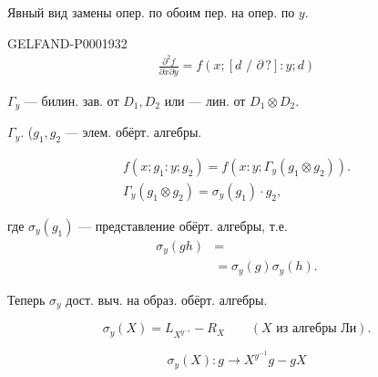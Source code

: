 \par\noindent\begin{minipage}{\linewidth}
Явный вид замены опер. по обоим пер. на опер.
по $y$.



\begin{GelfandAdjacentEvidence}{GELFAND-P000193}{2}
\begin{gather*}
\frac{\partial^2 f}{\partial x\partial y}=f(x;[d\text{ / }\partial\,?]:y;d)
\end{gather*}
\end{GelfandAdjacentEvidence}
\end{minipage}\par


$\Gamma_y$ — билин. зав. от $D_1,D_2$ или — лин. от $D_1\otimes D_2$.





 $\Gamma_y$. ($g_1,g_2$ — элем. обёрт. алгебры.



\begin{gather*}
f(x;g_1:y;g_2)=f(x:y;\Gamma_y(g_1\otimes g_2)).\\
\Gamma_y(g_1\otimes g_2)=\sigma_y(g_1)\cdot g_2,
\end{gather*}



где $\sigma_y(g_1)$ — представление обёрт. алгебры, т.е.
\begin{align*}
\sigma_y(gh)&=\\
&=\sigma_y(g)\sigma_y(h).
\end{align*}



Теперь $\sigma_y$ дост. выч. на образ. обёрт. алгебры.



\begin{equation*}
\sigma_y(X)=L_{X^{y^{-1}}}-R_X\qquad (X\text{ из алгебры Ли}).
\end{equation*}



\begin{equation*}\sigma_y(X):g\longrightarrow X^{y^{-1}}g-gX\end{equation*}



